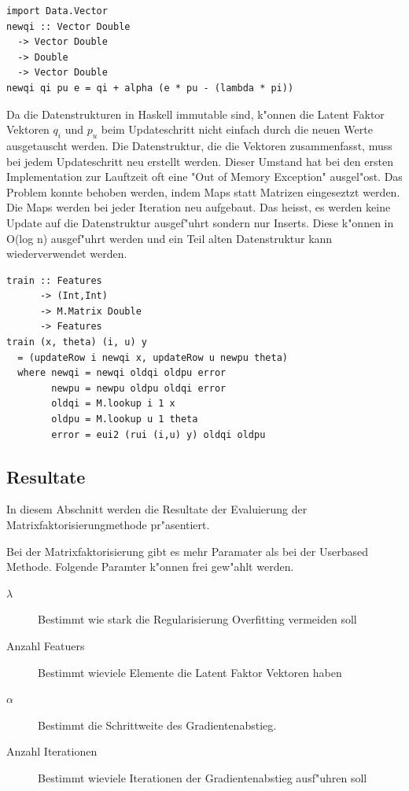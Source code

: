 \documentclass[a4paper, 12pt]{article}
\begin{document}
\begin{lstlisting}[caption=Berechnung eines Featurevektors, label={lst:step}]
import Data.Vector 
newqi :: Vector Double
  -> Vector Double
  -> Double
  -> Vector Double
newqi qi pu e = qi + alpha (e * pu - (lambda * pi))
\end{lstlisting}

Da die Datenstrukturen in Haskell immutable sind, k"onnen die Latent Faktor Vektoren $q_i$ und $p_u$ beim Updateschritt nicht einfach durch die neuen Werte ausgetauscht werden. Die Datenstruktur, die die Vektoren zusammenfasst, muss bei jedem Updateschritt neu erstellt werden. Dieser Umstand hat bei den ersten Implementation zur Lauftzeit oft eine "Out of Memory Exception" ausgel"ost. Das Problem konnte behoben werden, indem Maps statt Matrizen eingeseztzt werden. Die Maps werden bei jeder Iteration neu aufgebaut. Das heisst, es werden keine Update auf die Datenstruktur ausgef"uhrt sondern nur Inserts. Diese k"onnen in O(log n) ausgef"uhrt werden und ein Teil alten Datenstruktur kann wiederverwendet werden.

\begin{lstlisting}[caption=Implementation Funk SGD, label=lst:sgd] 
train :: Features
      -> (Int,Int) 
      -> M.Matrix Double 
      -> Features
train (x, theta) (i, u) y
  = (updateRow i newqi x, updateRow u newpu theta)
  where newqi = newqi oldqi oldpu error
        newpu = newpu oldpu oldqi error
        oldqi = M.lookup i 1 x
        oldpu = M.lookup u 1 theta
        error = eui2 (rui (i,u) y) oldqi oldpu  
\end{lstlisting}

\subsection{Resultate}
\label{sec:results}

In diesem Abschnitt werden die Resultate der Evaluierung der Matrixfaktorisierungmethode pr"asentiert.

Bei der Matrixfaktorisierung gibt es mehr Paramater als bei der Userbased Methode. Folgende Paramter k"onnen frei gew"ahlt werden.

\begin{description}
\item[$\lambda$] Bestimmt wie stark die Regularisierung Overfitting vermeiden soll
\item[Anzahl Featuers] Bestimmt wieviele Elemente die Latent Faktor Vektoren haben
\item[$\alpha$] Bestimmt die Schrittweite des Gradientenabstieg.
\item[Anzahl Iterationen] Bestimmt wieviele Iterationen der Gradientenabstieg ausf"uhren soll
\end{description}
\end{document}
